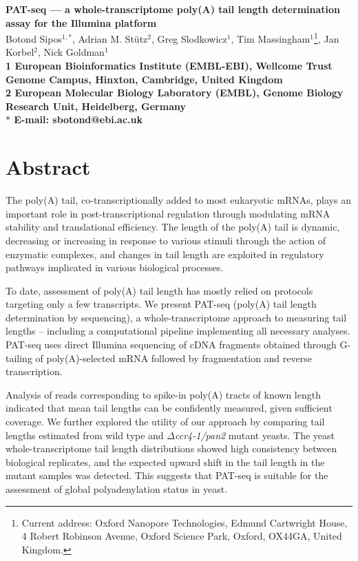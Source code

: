 \documentclass[10pt]{article}
\date{}
\begin{document}
\begin{flushleft}
{\Large
\textbf{PAT-seq --- a whole-transcriptome poly(A) tail length determination assay for the Illumina platform}
}
\\
Botond Sipos$^{1, \ast}$, 
Adrian M. St\"utz$^{2}$, 
Greg Slodkowicz$^{1}$,
Tim Massingham$^{1}$\footnote{Current address: Oxford Nanopore Technologies, Edmund Cartwright House, 4 Robert Robinson Avenue, Oxford Science Park, Oxford, OX44GA, United Kingdom.},
Jan Korbel$^{2}$, 
Nick Goldman$^{1}$
\\
\bf{1} European Bioinformatics Institute (EMBL-EBI), Wellcome Trust Genome Campus, Hinxton, Cambridge, United Kingdom
\\
\bf{2} European Molecular Biology Laboratory (EMBL), Genome Biology Research Unit, Heidelberg, Germany 
\\
$\ast$ E-mail: sbotond@ebi.ac.uk
\end{flushleft}


\section*{Abstract}

The poly(A) tail, co-transcriptionally added to most eukaryotic mRNAs, plays an important role in post-transcriptional regulation through modulating mRNA stability and translational efficiency. The length of the poly(A) tail is dynamic, decreasing or increasing in response to various stimuli through the action of enzymatic complexes, and changes in tail length are exploited in regulatory pathways implicated in various biological processes.

To date, assessment of poly(A) tail length has mostly relied on protocols targeting only a few transcripts. We present PAT-seq (poly(A) tail length determination by sequencing), a whole-transcriptome approach to measuring tail lengths  -- including a computational pipeline implementing all necessary analyses. PAT-seq uses direct Illumina sequencing of cDNA fragments obtained through G-tailing of poly(A)-selected mRNA followed by fragmentation and reverse transcription. 

Analysis of reads corresponding to spike-in poly(A) tracts of known length indicated that mean tail lengths can be confidently measured, given sufficient coverage. We further explored the utility of our approach by comparing tail lengths estimated from wild type and \textit{$\Delta$ccr4-1/pan2} mutant yeasts. The yeast whole-transcriptome tail length distributions showed high consistency between biological replicates, and the expected upward shift in the tail length in the mutant samples was detected. This suggests that PAT-seq is suitable for the assessment of global polyadenylation status in yeast.
\end{document}
